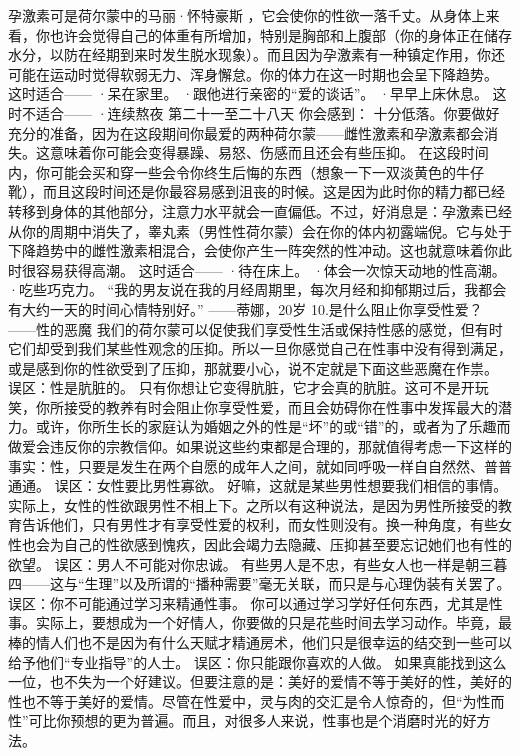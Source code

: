 \documentclass[12pt,UTF8]{ctexbook}
\begin{document}
孕激素可是荷尔蒙中的马丽·怀特豪斯 ，它会使你的性欲一落千丈。从身体上来看，你也许会觉得自己的体重有所增加，特别是胸部和上腹部（你的身体正在储存水分，以防在经期到来时发生脱水现象）。而且因为孕激素有一种镇定作用，你还可能在运动时觉得软弱无力、浑身懈怠。你的体力在这一时期也会呈下降趋势。
这时适合——
·呆在家里。
·跟他进行亲密的“爱的谈话”。
·早早上床休息。
这时不适合——
·连续熬夜
第二十一至二十八天
你会感到：
十分低落。你要做好充分的准备，因为在这段期间你最爱的两种荷尔蒙——雌性激素和孕激素都会消失。这意味着你可能会变得暴躁、易怒、伤感而且还会有些压抑。
在这段时间内，你可能会买和穿一些会令你终生后悔的东西（想象一下一双淡黄色的牛仔靴），而且这段时间还是你最容易感到沮丧的时候。这是因为此时你的精力都已经转移到身体的其他部分，注意力水平就会一直偏低。不过，好消息是：孕激素已经从你的周期中消失了，睾丸素（男性性荷尔蒙）会在你的体内初露端倪。它与处于下降趋势中的雌性激素相混合，会使你产生一阵突然的性冲动。这也就意味着你此时很容易获得高潮。
这时适合——
·待在床上。
·体会一次惊天动地的性高潮。
·吃些巧克力。
“我的男友说在我的月经周期里，每次月经和抑郁期过后，我都会有大约一天的时间心情特别好。”
——蒂娜，20岁
10.是什么阻止你享受性爱？
——性的恶魔
我们的荷尔蒙可以促使我们享受性生活或保持性感的感觉，但有时它们却受到我们某些性观念的压抑。所以一旦你感觉自己在性事中没有得到满足，或是感到你的性欲受到了压抑，那就要小心，说不定就是下面这些恶魔在作祟。
误区：性是肮脏的。
只有你想让它变得肮脏，它才会真的肮脏。这可不是开玩笑，你所接受的教养有时会阻止你享受性爱，而且会妨碍你在性事中发挥最大的潜力。或许，你所生长的家庭认为婚姻之外的性是“坏”的或“错”的，或者为了乐趣而做爱会违反你的宗教信仰。如果说这些约束都是合理的，那就值得考虑一下这样的事实：性，只要是发生在两个自愿的成年人之间，就如同呼吸一样自自然然、普普通通。
误区：女性要比男性寡欲。
好嘛，这就是某些男性想要我们相信的事情。实际上，女性的性欲跟男性不相上下。之所以有这种说法，是因为男性所接受的教育告诉他们，只有男性才有享受性爱的权利，而女性则没有。换一种角度，有些女性也会为自己的性欲感到愧疚，因此会竭力去隐藏、压抑甚至要忘记她们也有性的欲望。
误区：男人不可能对你忠诚。
有些男人是不忠，有些女人也一样是朝三暮四——这与“生理”以及所谓的“播种需要”毫无关联，而只是与心理伪装有关罢了。
误区：你不可能通过学习来精通性事。
你可以通过学习学好任何东西，尤其是性事。实际上，要想成为一个好情人，你要做的只是花些时间去学习动作。毕竟，最棒的情人们也不是因为有什么天赋才精通房术，他们只是很幸运的结交到一些可以给予他们“专业指导”的人士。
误区：你只能跟你喜欢的人做。
如果真能找到这么一位，也不失为一个好建议。但要注意的是：美好的爱情不等于美好的性，美好的性也不等于美好的爱情。尽管在性爱中，灵与肉的交汇是令人惊奇的，但“为性而性”可比你预想的更为普遍。而且，对很多人来说，性事也是个消磨时光的好方法。
\end{document}
